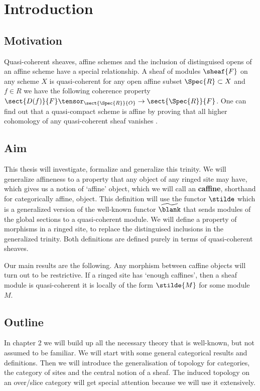 \chapter{Introduction}

\section{Motivation}
Quasi-coherent sheaves, affine schemes and the inclusion of distinguised opens of an affine scheme have a special relationship. 
A sheaf of modules $\sheaf{F}$ on any scheme $X$ is quasi-coherent 
\iff for any open affine subset $\Spec{R}\subset X$ and $f\in R$ 
we have the following coherence property $\sect{D(f)}{F} \tensor_{\sect{\Spec{R}}{O}} \rightarrow \sect{\Spec{R}}{F}$.
One can find out that a quasi-compact scheme is affine by proving that all higher cohomology of any quasi-coherent sheaf vanishes \cite[\href{http://stacks.math.columbia.edu/tag/01XF}{Tag 01XF}]{stacks}.

\section{Aim}
This thesis will investigate, formalize and generalize this trinity. 
We will generalize affineness to a property that any object of any ringed site may have, which gives us a notion of `affine' object, which we will call an \textbf{caffine}, shorthand for categorically affine, object. 
This definition will use the functor $\stilde$ which is a generalized version of the well-known functor $\widetilde{\blank}$ that sends modules of the global sections to a quasi-coherent module.
We will define a property  of morphisms in a ringed site, to replace the distinguised inclusions in the generalized trinity.
Both definitions are defined purely in terms of quasi-coherent sheaves.

Our main results are the following.
Any morphism between caffine objects will turn out to be restrictive.
If a ringed site has `enough caffines', then a sheaf module is quasi-coherent \iff
it is locally of the form $\stilde{M}$ for some module $M$.

\section{Outline}
In chapter 2 we will build up all the necessary theory that is well-known, but not assumed to be familiar.
We will start with some general categorical results and definitions.
Then we will introduce the generalisation of topology for categories, the category of sites and the central notion of a sheaf. The induced topology on an over/slice category will get special attention because we will use it extensively.

